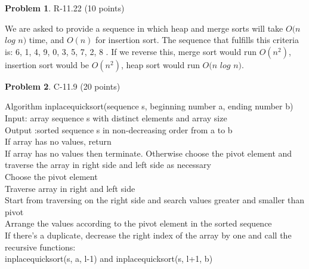 \documentclass[12pt]{report}
\theoremstyle{definition}
\newtheorem{problem}{Problem}
\begin{document}
\begin{problem} 	R-11.22 (10 points) 		
\end{problem}
				We are asked to provide a sequence in which heap and merge sorts will take $O(n$ $log$ $n)$ time, and $O(n)$ for insertion sort. The sequence that fulfills this criteria is: 6, 1, 4, 9, 0, 3, 5, 7, 2, 8 . \smallskip \newline If we reverse this, merge sort would run $O(n^2)$, insertion sort would be $O(n^2)$, heap sort would run $O(n$ $log$ $n)$.

\begin{problem} 	C-11.9 (20 points) 		
\end{problem}
				Algorithm inplacequicksort(sequence s, beginning number a, ending number b) \\
				Input: array sequence s with distinct elements and array size \\
				Output :sorted sequence s in non-decreasing order from a to b \\
				If array has no values, return \\
				If array has no values then terminate. Otherwise choose the pivot element and traverse the array in right side and left side as necessary \\
				Choose the pivot element \\
				Traverse array in right and left side \\
				Start from traversing on the right side and search values greater and smaller than pivot \\
				Arrange the values according to the pivot element in the sorted sequence \\
				If there's a duplicate, decrease the right index of the array by one and call the recursive functions: \\ 
				inplacequicksort(s, a, l-1) and inplacequicksort(s, l+1, b) \\	
						
\goodbreak
\end{document}
